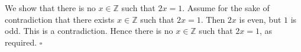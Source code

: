We show that there is no $x \in \mathbb{Z}$ such that $2x = 1$.
Assume for the sake of contradiction that there exists $x \in \mathbb{Z}$ such that $2x = 1$.
Then $2x$ is even, but $1$ is odd.
This is a contradiction.
Hence there is no $x \in \mathbb{Z}$ such that $2x = 1$, as required. \hfill$\square$